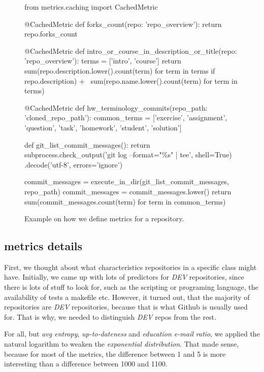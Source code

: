 \documentclass[a4paper]{scrartcl}
\begin{document}
	\begin{figure}[htb]
		\begin{python}
from metrics.caching import CachedMetric

@CachedMetric
def forks_count(repo: 'repo_overview'):
    return repo.forks_count

@CachedMetric
def intro_or_course_in_description_or_title(repo: 'repo_overview'):
    terms = ['intro', 'course']
    return sum(repo.description.lower().count(term) for term in terms if repo.description) + \
           sum(repo.name.lower().count(term) for term in terms)

@CachedMetric
def hw_terminology_commits(repo_path: 'cloned_repo_path'):
    common_terms = ['exercise', 'assignment', 'question', 'task', 'homework', 'student', 'solution']

    def git_list_commit_messages():
        return subprocess.check_output('git log --format="\%s" | tee', shell=True)
        	.decode('utf-8', errors='ignore')

    commit_messages = execute_in_dir(git_list_commit_messages, repo_path)
    commit_messages = commit_messages.lower()
    return sum(commit_messages.count(term) for term in common_terms)
		\end{python}
		\caption{Example on how we define metrics for a repository.}
		\label{fig:metrics}
	\end{figure}


	\clearpage

	\subsection{metrics details} %
	\label{sub:metrics_details}

	First, we thought about what characteristics repositories in a specific class might have. Initially, we came up with lots of predictors for \emph{DEV} repositories, since there is lots of stuff to look for, such as the scripting or programing language, the availability of tests a makefile etc. However, it turned out, that the majority of repositories are \emph{DEV} repositories, because that is what Github is usually used for. That is why, we needed to distinguish \emph{DEV} repos from the rest.

	For all, but \emph{avg entropy}, \emph{up-to-dateness} and \emph{education e-mail ratio}, we applied the natural logarithm to weaken the \emph{exponential distribution}. That made sense, because for most of the metrics, the difference between 1 and 5 is more interesting than a difference between 1000 and 1100.
\end{document}
